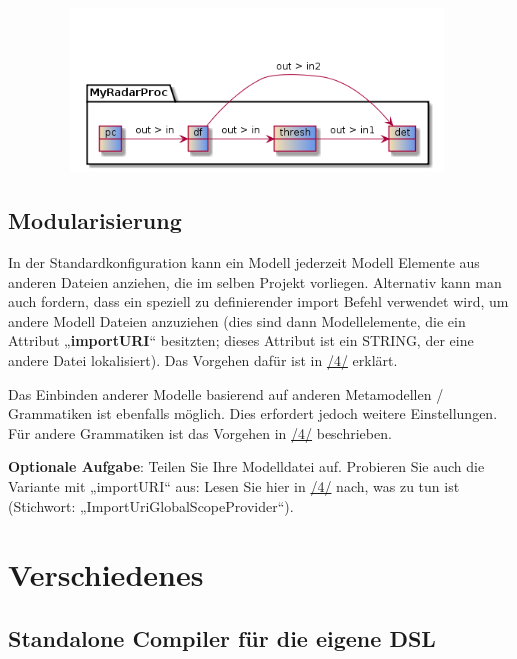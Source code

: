\documentclass[]{article}
\begin{document}
\includegraphics[width=5.19570in,height=1.71020in]{./Pictures/10000201000001EC000000D8D6389CC9995AC077.png}

\subsection[Modularisierung]{\texorpdfstring{\protect\hypertarget{anchor-48}{}{}Modularisierung}{Modularisierung}}\label{modularisierung}

In der Standardkonfiguration kann ein Modell jederzeit Modell Elemente
aus anderen Dateien anziehen, die im selben Projekt vorliegen.
Alternativ kann man auch fordern, dass ein speziell zu definierender
import Befehl verwendet wird, um andere Modell Dateien anzuziehen (dies
sind dann Modellelemente, die ein Attribut „\textbf{importURI}``
besitzten; dieses Attribut ist ein STRING, der eine andere Datei
lokalisiert). Das Vorgehen dafür ist in
\protect\hyperlink{anchor-4}{/4/} erklärt.

Das Einbinden anderer Modelle basierend auf anderen Metamodellen /
Grammatiken ist ebenfalls möglich. Dies erfordert jedoch weitere
Einstellungen. Für andere Grammatiken ist das Vorgehen in
\protect\hyperlink{anchor-4}{/4/} beschrieben.

\textbf{Optionale Aufgabe}: Teilen Sie Ihre Modelldatei auf. Probieren
Sie auch die Variante mit „importURI`` aus: Lesen Sie hier in
\protect\hyperlink{anchor-4}{/4/} nach, was zu tun ist (Stichwort:
„ImportUriGlobalScopeProvider``).

\section[Verschiedenes]{\texorpdfstring{\protect\hypertarget{anchor-49}{}{}Verschiedenes}{Verschiedenes}}\label{verschiedenes-1}

\subsection[Standalone Compiler für die eigene
DSL]{\texorpdfstring{\protect\hypertarget{anchor-50}{}{}Standalone
Compiler für die eigene
DSL}{Standalone Compiler für die eigene DSL}}\label{standalone-compiler-fuxfcr-die-eigene-dsl}
\end{document}
